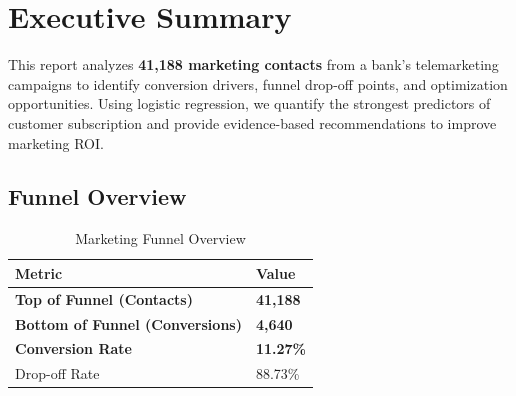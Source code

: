 \documentclass[11pt,a4paper]{article}
\begin{document}
\begin{titlepage}
\begin{center}
        \vfill
        
        \begin{center}
        \end{center}
    \end{center}
\end{titlepage}

\newpage
\renewcommand{\contentsname}{\color{primary}\Large\bfseries Table of Contents}
\tableofcontents
\newpage

\section{Executive Summary}

\begin{tcolorbox}[
    colback=accent!5,
    colframe=accent!40,
    arc=8pt,
    left=15pt,
    right=15pt,
    top=12pt,
    bottom=12pt
]
This report analyzes \textbf{41,188 marketing contacts} from a bank's telemarketing campaigns to identify conversion drivers, funnel drop-off points, and optimization opportunities. Using logistic regression, we quantify the strongest predictors of customer subscription and provide evidence-based recommendations to improve marketing ROI.
\end{tcolorbox}

\vspace{12pt}

\subsection{Funnel Overview}

\begin{table}[H]
\centering
\begin{tabular}{p{5cm} p{5cm}}
\toprule
\rowcolor{primary!10}
\textbf{Metric} & \textbf{Value} \\
\midrule
\textbf{Top of Funnel (Contacts)} & \textbf{41,188} \\
\textbf{Bottom of Funnel (Conversions)} & \textbf{4,640} \\
\textbf{Conversion Rate} & \textbf{11.27\%} \\
Drop-off Rate & 88.73\% \\
\bottomrule
\end{tabular}
\caption{Marketing Funnel Overview}
\end{table}
\end{document}

